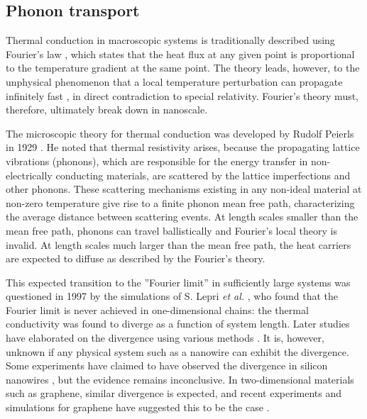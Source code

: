 \subsection{Phonon transport}



Thermal conduction in macroscopic systems is traditionally described using Fourier's law \cite{}, which states that the heat flux at any given point is proportional to the temperature gradient at the same point. The theory leads, however, to the unphysical phenomenon that a local temperature perturbation can propagate infinitely fast \cite{}, in direct contradiction to special relativity. Fourier's theory must, therefore, ultimately break down in nanoscale.

The microscopic theory for thermal conduction was developed by Rudolf Peierls in 1929 \cite{}. He noted that thermal resistivity arises, because the propagating lattice vibrations (phonons), which are responsible for the energy transfer in non-electrically conducting materials, are scattered by the lattice imperfections and other phonons. These scattering mechanisms existing in any non-ideal material at non-zero temperature give rise to a finite phonon mean free path, characterizing the average distance between scattering events. At length scales smaller than the mean free path, phonons can travel ballistically and Fourier's local theory is invalid. At length scales much larger than the mean free path, the heat carriers are expected to diffuse as described by the Fourier's theory.

This expected transition to the ''Fourier limit'' in sufficiently large systems was questioned in 1997 by the simulations of S. Lepri \textit{et al.} \cite{lepri97}, who found that the Fourier limit is never achieved in one-dimensional chains: the thermal conductivity was found to diverge as a function of system length. Later studies have elaborated on the divergence using various methods \cite{narayan02,mai07}. It is, however, unknown if any physical system such as a nanowire can exhibit the divergence. Some experiments have claimed to have observed the divergence in silicon nanowires \cite{yang10}, but the evidence remains inconclusive. In two-dimensional materials such as graphene, similar divergence is expected, and recent experiments and simulations for graphene have suggested this to be the case \cite{xu14}. 

